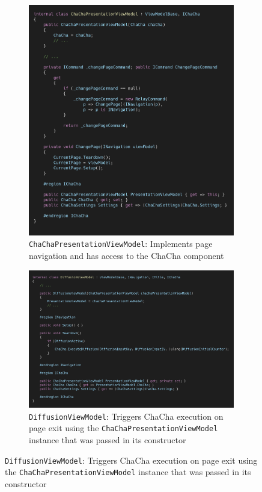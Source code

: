 \begin{figure}
\centering
\caption{Triggering ChaCha execution with values entered in Diffusion page}
\label{fig:mvvm.chachatrigger}
\begin{subfigure}[t]{0.5\textwidth}
\label{fig:mvvm.chachapresentationviewmodel}
\centering
\includegraphics[width=0.99\textwidth]{figures/code/mvvm-arch/chachaPresentationViewModel.png}
\caption{\texttt{ChaChaPresentationViewModel}: Implements page navigation and has access to the ChaCha component}
\end{subfigure}%
\begin{subfigure}[t]{0.5\textwidth}
\label{fig:mvvm.viewmodelbase}
\centering
\includegraphics[width=0.99\textwidth]{figures/code/mvvm-arch/diffusionViewModel.png}
\caption{\texttt{DiffusionViewModel}: Triggers ChaCha execution on page exit using the \texttt{ChaChaPresentationViewModel} instance that was passed in its constructor}
\end{subfigure}
\end{figure}

